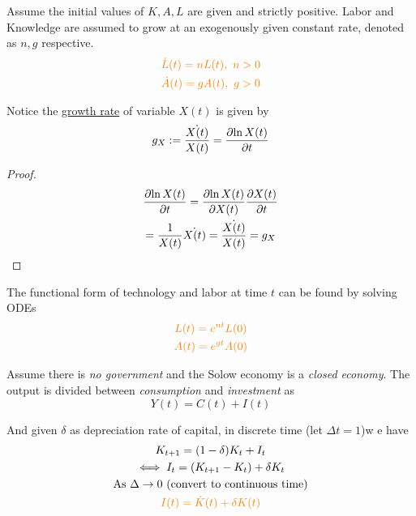 \documentclass[11pt]{article}
\begin{document}
			\begin{assumption}
				Assume the initial values of $K, A, L$ are given and strictly positive. Labor and Knowledge are assumed to grow at an exogenously given constant rate, denoted as $n, g$ respective.
				\begin{gather}
				\textcolor{orange}{
					\dot{L}(t) = nL(t),\ n > 0 }\\
					\textcolor{orange}{
						\dot{A}(t) = gA(t),\ g > 0
					}
				\end{gather}
			\end{assumption}
			
			\begin{proposition}
				Notice the \ul{growth rate} of variable $X(t)$ is given by 
				\[
					g_X := \frac{\dot{X(t)}}{X(t)} = \frac{\partial{\ln{X(t)}}}{\partial{t}}
				\]
			\end{proposition}
			\begin{proof}
				\begin{gather}
					\frac{\partial{\ln{X(t)}}}{\partial{t}} = \frac{\partial{\ln{X(t)}}}{\partial{X(t)}} \frac{\partial{X(t)}}{\partial{t}} \\
					= \frac{1}{X(t)} \dot{X(t)}
					= \frac{\dot{X(t)}}{X(t)}
					= g_X \\
				\end{gather}
			\end{proof}
			
			\begin{proposition}
				The functional form of technology and labor at time $t$ can be found by solving ODEs 
				\begin{gather}
					\textcolor{orange}{
						L(t) = e^{nt} L(0)
						} \\
					\textcolor{orange}{
						A(t) = e^{gt} A(0)
						}
				\end{gather}
			\end{proposition}
			
			\begin{assumption}
				Assume there is \emph{no government} and the Solow economy is a \emph{closed economy}. The output is divided between \emph{consumption} and \emph{investment} as 
				\begin{equation}
					Y(t) = C(t) + I(t)
				\end{equation}
			\end{assumption}
			\par And given $\delta$ as depreciation rate of capital, in discrete time (let $\Delta t = 1$)w e have 
			\begin{gather}
				K_{t+1} = (1-\delta)K_t + I_t \\
				\iff I_t = (K_{t+1} - K_t) + \delta K_t \\
				\text{{As }} \Delta \to 0 \text{{ (convert to continuous time)}}\\
				\textcolor{orange}{I(t) = \dot{K}(t) + \delta K(t)}
			\end{gather}
			
\end{document}
